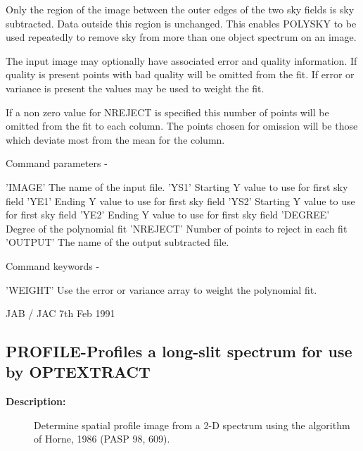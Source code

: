 \begin{description}
\begin{description}
\begin{terminalv}
 Only the region of the image between the outer edges of the two sky
 fields is sky subtracted. Data outside this region is unchanged.
 This enables POLYSKY to be used repeatedly to remove sky from more
 than one object spectrum on an image.

 The input image may optionally have associated error and quality
 information. If quality is present points with bad quality will
 be omitted from the fit. If error or variance is present the values
 may be used to weight the fit.

 If a non zero value for NREJECT is specified this number of points
 will be omitted from the fit to each column. The points chosen for
 omission will be those which deviate most from the mean for the column.

 Command parameters -

 'IMAGE'    The name of the input file.
 'YS1'      Starting Y value to use for first sky field
 'YE1'      Ending Y value to use for first sky field
 'YS2'      Starting Y value to use for first sky field
 'YE2'      Ending Y value to use for first sky field
 'DEGREE'   Degree of the polynomial fit
 'NREJECT'  Number of points to reject in each fit
 'OUTPUT'   The name of the output subtracted file.

 Command keywords -

 'WEIGHT'   Use the error or variance array to weight the
            polynomial fit.

                                 JAB / JAC 7th Feb 1991
\end{terminalv}
\end{description}
\subsection{PROFILE-\label{PROFILE}Profiles a long-slit spectrum for use by OPTEXTRACT}
\begin{description}

\item [\textbf{Description:}]
 Determine spatial profile image from a 2-D spectrum using the
 algorithm of Horne, 1986 (PASP 98, 609).


\end{description}
\end{description}

